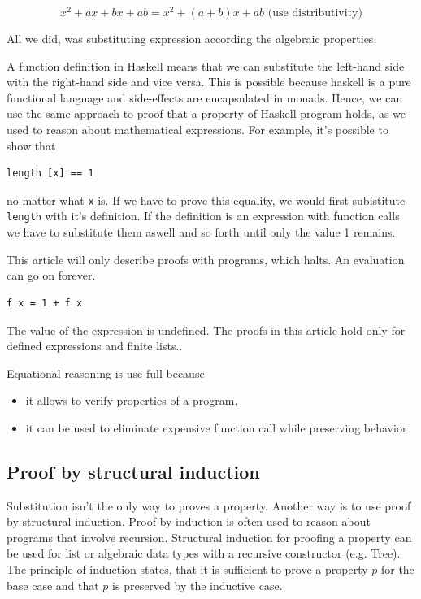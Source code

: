 \begin{equation}
x^2 + ax + bx + ab = x^2 + (a + b)x + ab \text{     (use distributivity)}
\end{equation}

All we did, was substituting expression according the algebraic properties.

A function definition in Haskell means that we can substitute the left-hand side with the right-hand side and vice versa. This is possible because haskell is a pure functional language and side-effects are encapsulated in monads. Hence, we can use the same approach to proof that a property of Haskell program holds, as we used to reason about mathematical expressions. 
For example, it's possible to show that 
\begin{verbatim}
length [x] == 1
\end{verbatim}
no matter what \verb|x| is. If we have to prove this equality, we would first subistitute \verb|length| with it's definition. If the definition is an expression with function calls we have to substitute them aswell and so forth until only the value 1 remains.

This article will only describe proofs with programs, which halts. An evaluation can go on forever.
\begin{verbatim}
f x = 1 + f x
\end{verbatim}

The value of the expression is undefined. The proofs in this article hold only for defined expressions and finite lists..

Equational reasoning is use-full because
\begin{itemize}
\item it allows to verify properties of a program.
\item it can be used to eliminate expensive function call while preserving behavior
\end{itemize}

\subsection{Proof by structural induction}
\label{sec:induction}

Substitution isn't the only way to proves a property. Another way is to use proof by structural induction. Proof by induction is often used to reason about programs that involve recursion. 
Structural induction for proofing a property can be used for list or algebraic data types with a recursive constructor (e.g. Tree).
 The principle of induction states, that it is sufficient to prove a property $p$ for the base case and that $p$ is preserved by the inductive case.

